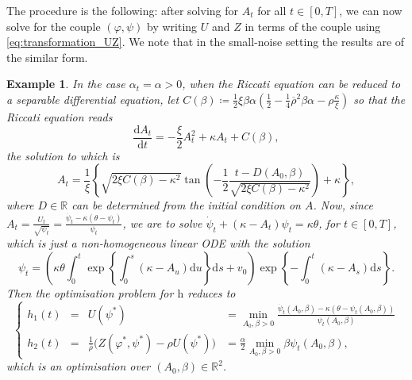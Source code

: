 \documentclass{amsart}[11pt]
\numberwithin{equation}{section}
\numberwithin{theorem}{subsection}
\numberwithin{proposition}{subsection}
\numberwithin{definition}{subsection}
\numberwithin{lemma}{subsection}
\newtheorem*{example}{Example}
\numberwithin{assumption}{subsection}
\newcommand{\RR}{\mathbb{R}}
\newcommand{\brho}{\overline{\rho}}
\newcommand{\D}{\mathrm{d}}
\newcommand{\hh}{\boldsymbol{\mathrm{h}}}
\begin{document}
The procedure is the following: after solving for $A_t$ for all $t\in[0,T]$, we can now solve for the couple $(\varphi,\psi)$ by writing $U$ and $Z$ in terms of the couple using \eqref{eq:transformation_UZ}. 
We note that in the small-noise setting the results are of the similar form.
\begin{example}
In the case $\alpha_t=\alpha>0$, when the Riccati equation can be reduced to a separable differential equation, 
let $C(\beta)\coloneqq \frac12\xi\beta\alpha\left(\frac12-\frac14\brho^2\beta\alpha-\rho\frac\kappa\xi\right)$ so that the Riccati equation reads
\[
\frac{\D A_t}{\D t} = -\frac\xi 2 A^2_t + \kappa A_t + C(\beta),
\]
the solution to which is\[
A_t = \frac1\xi\left\{\sqrt{2\xi C(\beta)-\kappa^2}\tan\left(-\frac12\frac{t-D(A_0, \beta)}{\sqrt{2\xi C(\beta)-\kappa^2}}\right)+\kappa\right\},
\]
where $D\in\RR$ can be determined from the initial condition on $A$. Now, since $A_t=\tfrac{U_t}{\sqrt{\psi_t}}=\tfrac{\dot\psi_t-\kappa(\theta-\psi_t)}{\psi_t}$, we are to solve
$\dot\psi_t + (\kappa - A_t)\psi_t = \kappa\theta$,
for $t \in[0,T]$,
which is just a non-homogeneous linear ODE with the solution
$$
\psi_t = \left(\kappa\theta\int_0^t 
\exp\left\{\int_0^s (\kappa-A_u)\D u\right\}\D s + v_0\right)
\exp\left\{-\int_0^t (\kappa-A_s)\D s\right\}.
$$
Then the optimisation problem for $\hh$ reduces to
\begin{equation*}
\left\{
\begin{array}{rcll}
h_1(t)
 & = & \displaystyle U(\psi^{*})
 & = \displaystyle \min_{A_0, \beta>0} \frac{\dot \psi_t(A_0, \beta)-\kappa(\theta-\psi_t(A_0, \beta))}{\psi_t(A_0, \beta)} \\
h_2(t)
& = & \displaystyle \frac{1}{\brho} \Big(Z(\varphi^{*}, \psi^{*})-\rho U(\psi^{*})\Big)
& = \displaystyle \frac{\alpha}{2}\min_{A_0, \beta>0} \beta\psi_t(A_0, \beta),
\end{array}
\right.
\end{equation*}
which is an optimisation over $(A_0,\beta)\in \RR^2$.
\end{example}
\end{document}
